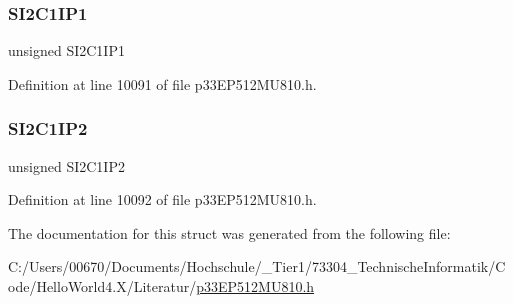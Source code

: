\subsubsection{\texorpdfstring{S\+I2\+C1\+I\+P1}{SI2C1IP1}}
{\footnotesize\ttfamily unsigned S\+I2\+C1\+I\+P1}



Definition at line 10091 of file p33\+E\+P512\+M\+U810.\+h.

\mbox{\label{structtag_i_p_c4_b_i_t_s_a14aa717bb6b0ff307a918373f3e667b2}} 
\subsubsection{\texorpdfstring{S\+I2\+C1\+I\+P2}{SI2C1IP2}}
{\footnotesize\ttfamily unsigned S\+I2\+C1\+I\+P2}



Definition at line 10092 of file p33\+E\+P512\+M\+U810.\+h.



The documentation for this struct was generated from the following file\+:\begin{DoxyCompactItemize}
\item 
C\+:/\+Users/00670/\+Documents/\+Hochschule/\+\_\+\+Tier1/73304\+\_\+\+Technische\+Informatik/\+Code/\+Hello\+World4.\+X/\+Literatur/\hyperlink{p33_e_p512_m_u810_8h}{p33\+E\+P512\+M\+U810.\+h}\end{DoxyCompactItemize}
